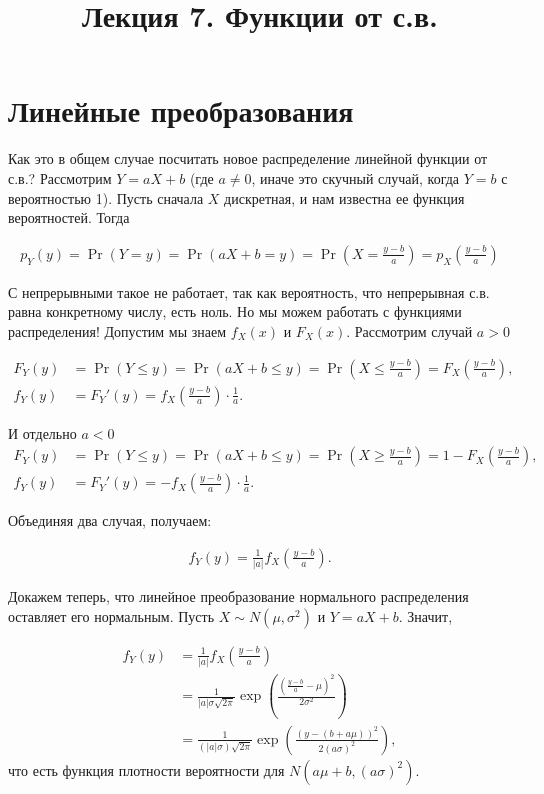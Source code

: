 \documentclass[12pt]{article}
\title{Лекция 7. Функции от с.в.}
\begin{document}
\maketitle

\section{Линейные преобразования}

Как это в общем случае посчитать новое распределение линейной функции от с.в.? Рассмотрим $Y = aX + b$ (где $a \ne 0$, иначе это скучный случай, когда $Y = b$ с вероятностью 1). Пусть сначала $X$ дискретная, и нам известна ее функция вероятностей. Тогда

\begin{align*}
  p_Y(y) = \Pr(Y = y) = \Pr(aX + b = y) = \Pr\left(X = \frac{y - b}{a}\right) = p_X\left( \frac{y - b}{a}\right)
\end{align*}

С непрерывными такое не работает, так как вероятность, что непрерывная с.в. равна конкретному числу, есть ноль. Но мы можем работать с функциями распределения! Допустим мы знаем $f_X(x)$ и $F_X(x)$. Рассмотрим случай $a > 0$

\begin{align*}
  F_Y(y) &= \Pr(Y \le y) = \Pr(aX + b \le y) = \Pr\left(X \le \frac{y - b}{a}\right) = F_X\left(\frac{y - b}{a}\right), \\
  f_Y(y) &= F_Y'(y) = f_X\left(\frac{y - b}{a}\right) \cdot \frac{1}{a}.
\end{align*}

И отдельно $a < 0$
\begin{align*}
  F_Y(y) &= \Pr(Y \le y) = \Pr(aX + b \le y) = \Pr\left(X \ge \frac{y - b}{a}\right) = 1 - F_X\left(\frac{y - b}{a}\right), \\
  f_Y(y) &= F_Y'(y) = -f_X\left(\frac{y - b}{a}\right) \cdot \frac{1}{a}.
\end{align*}

Объединяя два случая, получаем:

\begin{align*}
  f_Y(y) = \frac{1}{|a|}f_X\left(\frac{y - b}{a}\right).
\end{align*}

Докажем теперь, что линейное преобразование нормального распределения оставляет его нормальным. Пусть $X \sim N(\mu, \sigma^2)$ и $Y = aX + b$. Значит,

\begin{align*}
  f_Y(y) &= \frac{1}{|a|}f_X\left(\frac{y - b}{a}\right) \\
         &= \frac{1}{|a|\sigma \sqrt{2\pi}} \exp\left(\frac{\left(\frac{y - b}{a} - \mu\right)^2}{2\sigma^2}\right) \\
         &= \frac{1}{(|a|\sigma) \sqrt{2\pi}} \exp\left(\frac{\left(y - (b + a\mu)\right)^2}{2(a\sigma)^2}\right),
\end{align*}
что есть функция плотности вероятности для $N(a\mu + b, (a\sigma)^2)$.
\end{document}
